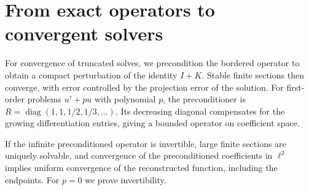 \chapter{From exact operators to convergent solvers}\label{chap:solvers}

For convergence of truncated solves, we precondition the bordered operator
to obtain a compact perturbation of the identity $I+K$. Stable finite sections
then converge, with error controlled by the projection error of the solution.
For first-order problems $u'+pu$ with polynomial $p$, the preconditioner is
$R=\operatorname{diag}(1,1,1/2,1/3,\ldots)$. Its decreasing diagonal compensates
for the growing differentiation entries, giving a bounded operator on
coefficient space.

If the infinite preconditioned operator is invertible, large finite sections are
uniquely solvable, and convergence of the preconditioned coefficients in $\ell^2$
implies uniform convergence of the reconstructed function, including the
endpoints. For $p=0$ we prove invertibility.

